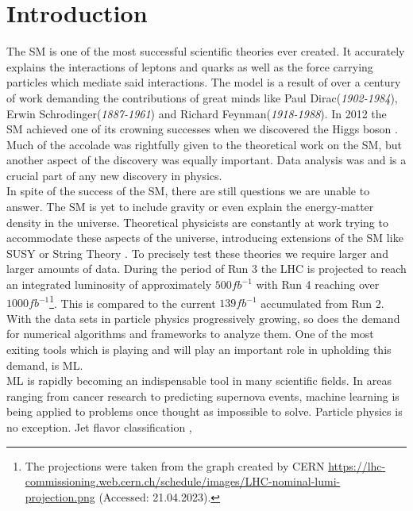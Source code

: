 \chapter*{Introduction}
The \ac{SM} is one of the most successful scientific theories ever
created. It accurately explains the interactions of leptons and quarks as well as the force
carrying particles which mediate said interactions. The model is a result of over a century of work
demanding the contributions of great minds like Paul Dirac(\emph{1902-1984}), Erwin Schrodinger(\emph{1887-1961}) and Richard Feynman(\emph{1918-1988}).
In 2012 the \ac{SM} achieved one of its crowning successes when we discovered the Higgs boson \cite{Aad_2012}. 
Much of the accolade was rightfully given to the theoretical work on the \ac{SM}, but another aspect of the discovery 
was equally important. Data analysis was and is a crucial part of any new discovery in physics. \newline
\\
In spite of the success of the \ac{SM}, there are still questions we are unable to answer.
The \ac{SM} is yet to include gravity or even explain the energy-matter density in the universe. Theoretical physicists 
are constantly at work trying to accommodate these aspects of the universe,
introducing extensions of the \ac{SM} like \ac{SUSY} \cite{SUSY} or String Theory \cite{cole_probing_2021}. To precisely test these theories
we require larger and larger amounts of data. During the period of Run 3 the \ac{LHC} is projected to reach an integrated luminosity of approximately  
$500fb^{-1}$ with Run 4 reaching over $1000fb^{-1}$\footnote{The projections were taken from the graph created by CERN
\href{https://lhc-commissioning.web.cern.ch/schedule/images/LHC-nominal-lumi-projection.png}{https://lhc-commissioning.web.cern.ch/schedule/images/LHC-nominal-lumi-projection.png}
(Accessed: 21.04.2023).}. This is compared to the current $139fb^{-1}$ accumulated from Run 2. With the data sets in particle physics progressively growing, 
so does the demand for numerical algorithms and frameworks to analyze them. One of the most exiting tools which is playing and will play an important role in upholding 
this demand, is \ac{ML}.\newline
\\
\acf{ML} is rapidly becoming an indispensable tool in many scientific fields.
In areas ranging from cancer research to predicting supernova events, machine learning is being applied to problems
once thought as impossible to solve. Particle physics is no exception. Jet flavor classification \cite{Guest_2016}, 
